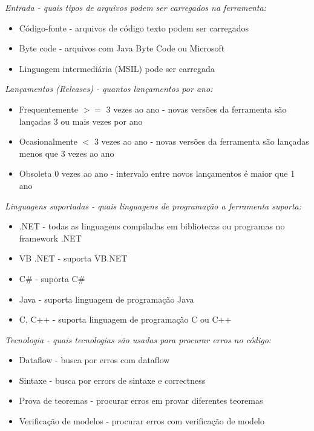 \begin{description}

  \item {\it Entrada - quais tipos de arquivos podem ser carregados na ferramenta:}
    \begin{itemize}
      \item Código-fonte - arquivos de código texto podem ser carregados
      \item Byte code - arquivos com Java Byte Code ou Microsoft
      \item Linguagem intermediária (MSIL) pode ser carregada
    \end{itemize}

  \item {\it Lançamentos ({\it Releases}) - quantos lançamentos por ano:}
    \begin{itemize}
      \item Frequentemente $>=$ 3 vezes ao ano - novas versões da ferramenta são lançadas 3 ou mais vezes por ano
      \item Ocasionalmente $<$ 3 vezes ao ano - novas versões da ferramenta são lançadas menos que 3 vezes ao ano
      \item Obsoleta 0 vezes ao ano - intervalo entre novos lançamentos é maior que 1 ano
    \end{itemize}

  \item {\it Linguagens suportadas - quais linguagens de programação a ferramenta suporta:}
    \begin{itemize}
      \item .NET - todas as linguagens compiladas em bibliotecas ou programas no framework .NET
      \item VB .NET - suporta VB.NET
      \item C\# - suporta C\#
      \item Java - suporta linguagem de programação Java
      \item C, C++ - suporta linguagem de programação C ou C++
    \end{itemize}

  \item {\it Tecnologia - quais tecnologias são usadas para procurar erros no código:}
    \begin{itemize}
      \item Dataflow - busca por erros com dataflow
      \item Sintaxe - busca por errors de sintaxe e correctness
      \item Prova de teoremas - procurar erros em provar diferentes teoremas
      \item Verificação de modelos - procurar erros com verificação de modelo
    \end{itemize}


\end{description}
